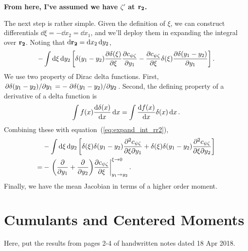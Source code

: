 \documentclass{paper}
\newcommand{\cpz}{c_{\psi\zeta}}
\newcommand{\rr}[1]{\vb{r_{#1}}}
\begin{document}
\textbf{From here, I've assumed we have $\zeta'$ at $\rr2$.}

The next step is rather simple. Given the definition of $\xi$, we can construct differentials $\dd{\xi} = -\dd{x_2} = \dd{x_1}$, and we'll deploy them in expanding the integral over $\rr2$. Noting that $\dd{\rr2} = \dd{x_2}\dd{y_2}$,
\begin{equation}
  \label{eq:expand_int_rr2}
  - \int \dd{\xi} \dd{y_2} \left[ \delta(y_1 - y_2)\pdv{\delta(\xi)}{\xi} \pdv{\cpz}{y_1} - \pdv{\cpz}{\xi} \delta(\xi)\pdv{\delta(y_1 - y_2)}{y_1}\right].
\end{equation}
We use two property of Dirac delta functions. First, $\pdv*{\delta(y_1 - y_2)}{y_1} = -\pdv*{\delta(y_1 - y_2)}{y_2}$. Second, the defining property of a derivative of a delta function is
\begin{equation}
  \label{eq:dirac_derivative}
  \int f(x) \dv{\delta(x)}{x} \dd{x} = \int \dv{f(x)}{x} \delta(x) \dd{x}.
\end{equation}
Combining these with equation~(\ref{eq:expand_int_rr2}),
\begin{equation}
  \label{eq:expand_int_rr2_dirac}
  \begin{split}
    & - \int \dd{\xi} \dd{y_2} \left[ \delta(\xi)\delta(y_1 - y_2)\pdv{\cpz}{\xi}{y_1} + \delta(\xi)\delta(y_1 - y_2)\pdv{\cpz}{\xi}{y_2}\right]\\
    = & -\eval{\qty(\pdv{y_1} + \pdv{y_2}) \pdv{\cpz}{\xi}}_{y_1 \to y_2}^{\xi \to 0}.    
  \end{split}
\end{equation}
Finally, we have the mean Jacobian in terms of a higher order moment.
\section{Cumulants and Centered Moments}
\label{sec:cumul-cent-moments}

Here, put the results from pages 2-4 of handwritten notes dated 18 Apr 2018.
\end{document}

